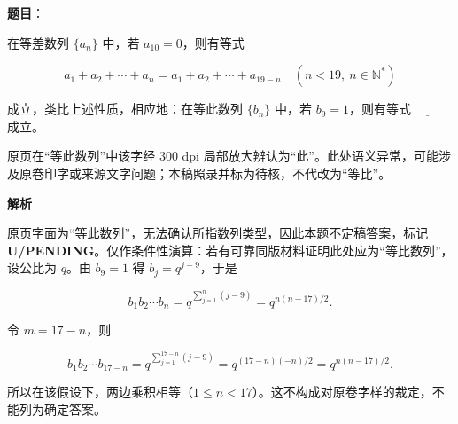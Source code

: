 \begin{answer}

\textbf{题目}：

在等差数列 $\{a_n\}$ 中，若 $a_{10}=0$，则有等式

\nopagebreak[4]
\[
a_1+a_2+\cdots+a_n=a_1+a_2+\cdots+a_{19-n}\quad(n<19,\ n\in\mathbb{N}^{*})
\]

成立，类比上述性质，相应地：在等此数列 $\{b_n\}$ 中，若 $b_9=1$，则有等式 $\underline{\qquad}$ 成立。

\begin{gktip}
原页在“等此数列”中该字经 300 dpi 局部放大辨认为“此”。此处语义异常，可能涉及原卷印字或来源文字问题；本稿照录并标为待核，不代改为“等比”。
\end{gktip}

\textbf{解析}

原页字面为“等此数列”，无法确认所指数列类型，因此本题不定稿答案，标记 \textbf{U/PENDING}。仅作条件性演算：若有可靠同版材料证明此处应为“等比数列”，设公比为 $q$。由 $b_9=1$ 得 $b_j=q^{j-9}$，于是

\nopagebreak[4]
\[
b_1b_2\cdots b_n=q^{\sum_{j=1}^{n}(j-9)}=q^{n(n-17)/2}.
\]

令 $m=17-n$，则

\nopagebreak[4]
\[
b_1b_2\cdots b_{17-n}
=q^{\sum_{j=1}^{17-n}(j-9)}
=q^{(17-n)(-n)/2}
=q^{n(n-17)/2}.
\]

所以在该假设下，两边乘积相等（$1\leq n<17$）。这不构成对原卷字样的裁定，不能列为确定答案。


\end{answer}

